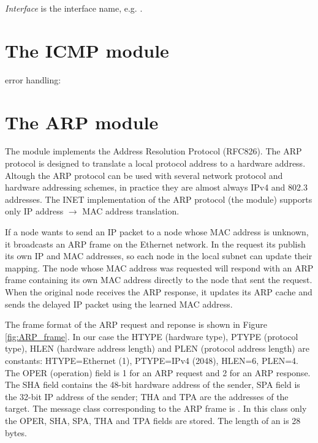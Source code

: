 \textit{Interface} is the interface name, e.g. .



\section{The ICMP module}

error handling: 


\section{The ARP module}

The  module implements the Address Resolution Protocol (RFC826).
The ARP protocol is designed to translate a local protocol address
to a hardware address. Altough the ARP protocol can be used with
several network protocol and hardware addressing schemes, in practice
they are almost always IPv4 and 802.3 addresses. The INET implementation
of the ARP protocol (the  module) supports only
IP address $\rightarrow$ MAC address translation. 

If a node wants to send an IP packet to a node whose MAC address is unknown,
it broadcasts an ARP frame on the Ethernet network.
In the request its publish its own IP and
MAC addresses, so each node in the local subnet can update their mapping.
The node whose MAC address was requested will respond with an ARP frame
containing its own MAC address directly to the node that sent the
request. When the original node receives the ARP response, it updates 
its ARP cache and sends the delayed IP packet using the learned MAC address.

The frame format of the ARP request and reponse is shown in Figure \ref{fig:ARP_frame}.
In our case the HTYPE (hardware type), PTYPE (protocol type), HLEN (hardware address length)
and PLEN (protocol address length) are constants: HTYPE=Ethernet (1), PTYPE=IPv4 (2048), HLEN=6,
PLEN=4. The OPER (operation) field is 1 for an ARP request and 2 for an ARP response.
The SHA field contains the 48-bit hardware address of the sender, SPA field is
the 32-bit IP address of the sender; THA and TPA are the addresses of the target.
The message class corresponding to the ARP frame is .
In this class only the OPER, SHA, SPA, THA and TPA fields are stored.
The length of an  is 28 bytes.

